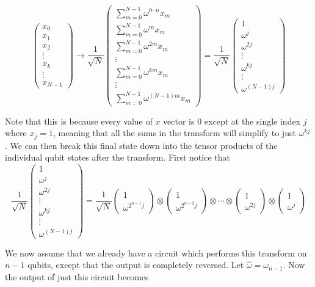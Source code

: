 \documentclass[11pt]{report}
\newcommand{\?}{\stackrel{?}{=}}
\newcommand{\qcol}[2]{\ensuremath{\begin{pmatrix} #1 \\ #2 \end{pmatrix}}}
\begin{document}
$$\begin{pmatrix}
	x_0 \\
	x_1 \\
	x_2 \\
	\vdots \\
    x_k \\
    \vdots \\
    x_{N-1}
  \end{pmatrix}
\to \frac{1}{\sqrt{N}}
  \begin{pmatrix}
	\sum_{m=0}^{N-1} \omega^{0\cdot n} x_m\\
	\sum_{m=0}^{N-1} \omega^{m} x_m \\
	\sum_{m=0}^{N-1} \omega^{2m} x_m \\
	\vdots \\
    \sum_{m=0}^{N-1} \omega^{km} x_m \\
    \vdots \\
    \sum_{m=0}^{N-1} \omega^{(N-1)m} x_m
  \end{pmatrix} = 
  \frac{1}{\sqrt{N}}
  \begin{pmatrix}
	1\\
	\omega^{j} \\
	\omega^{2j} \\
	\vdots \\
    \omega^{kj} \\
    \vdots \\
    \omega^{(N-1)j}
  \end{pmatrix}
$$

Note that this is because every value of $x$ vector is 0 except at the single index $j$ where $x_j = 1$, meaning that all the sums in the transform will simplify to just $\omega^{kj}$.
We can then break this final state down into the tensor products of the individual qubit states after the transform. First notice that 
$$\frac{1}{\sqrt{N}}
  \begin{pmatrix}
	1\\
	\omega^{j} \\
	\omega^{2j} \\
	\vdots \\
    \omega^{kj} \\
    \vdots \\
    \omega^{(N-1)j}
  \end{pmatrix} = 
  \frac{1}{\sqrt{N}}
  \qcol{1}{\omega^{2^{n-1}j}}
  \otimes
  \qcol{1}{\omega^{2^{n-2}j}}
  \otimes \cdots \otimes
  \qcol{1}{\omega^{2j}}
  \otimes
  \qcol{1}{\omega^{j}}
$$

We now assume that we already have a circuit which performs this transform on $n-1$ qubits, except that the output is completely reversed. Let $\hat{\omega} = \omega_{n-1}$. Now the output of just this circuit becomes 
\end{document}
